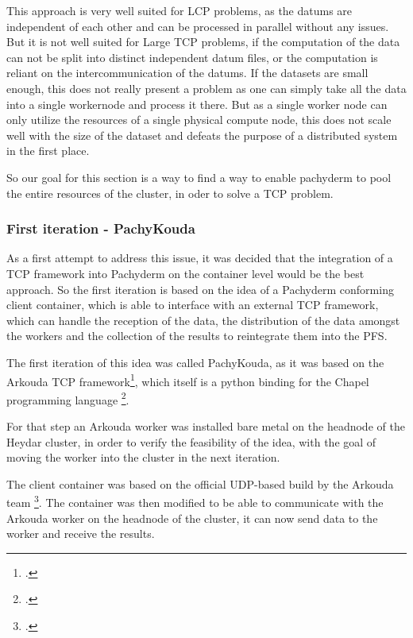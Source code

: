This approach is very well suited for \ac{LCP} problems, as the datums are independent of each other and can be processed in parallel without any issues.
But it is not well suited for Large \ac{TCP} problems, if the computation of the data can not be split into distinct independent datum files, or the computation is reliant on the intercommunication of the datums.
If the datasets are small enough, this does not really present a problem as one can simply take all the data into a single workernode and process it there.
But as a single worker node can only utilize the resources of a single physical compute node, this does not scale well with the size of the dataset and defeats the purpose of a distributed system in the first place.

So our goal for this section is a way to find a way to enable pachyderm to pool the entire resources of the cluster, in oder to solve a \ac{TCP} problem.

\subsubsection{First iteration - PachyKouda}

As a first attempt to address this issue, it was decided that the integration of a \ac{TCP} framework into Pachyderm on the container level would be the best approach.
So the first iteration is based on the idea of a Pachyderm conforming client container, which is able to interface with an external \ac{TCP} framework,
which can handle the reception of the data, the distribution of the data amongst the workers and the collection of the results to reintegrate them into the \ac{PFS}.

The first iteration of this idea was called PachyKouda, as it was based on the Arkouda \ac{TCP} framework\footcite{ArkoudaGituhbRepository2023},
which itself is a python binding for the Chapel programming language \footcite{ChapellangChapelProductive}. 

For that step an Arkouda worker was installed bare metal on the headnode of the Heydar cluster, in order to verify the feasibility of the idea,
with the goal of moving the worker into the cluster in the next iteration.

The client container was based on the official \ac{UDP}-based build by the Arkouda team \footcite{ArkoudacontribArkoudadockerMain}.
The container was then modified to be able to communicate with the Arkouda worker on the headnode of the cluster, it can now send data to the worker and receive the results.

